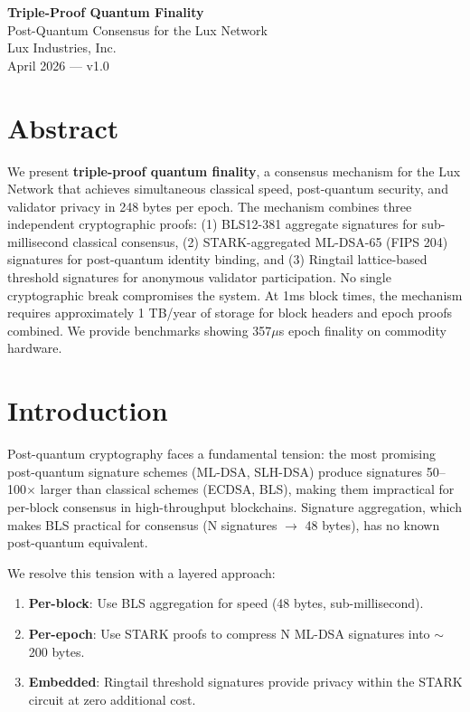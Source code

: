 \documentclass[11pt,a4paper]{article}
\begin{document}
\begin{center}
{\LARGE\bfseries Triple-Proof Quantum Finality}\\[0.5em]
{\Large Post-Quantum Consensus for the Lux Network}\\[1em]
{\large Lux Industries, Inc.}\\[0.5em]
{\normalsize April 2026 --- v1.0}
\end{center}

\vspace{1em}

\section*{Abstract}

We present \textbf{triple-proof quantum finality}, a consensus mechanism for the Lux Network that achieves simultaneous classical speed, post-quantum security, and validator privacy in 248 bytes per epoch. The mechanism combines three independent cryptographic proofs: (1) BLS12-381 aggregate signatures for sub-millisecond classical consensus, (2) STARK-aggregated ML-DSA-65 (FIPS 204) signatures for post-quantum identity binding, and (3) Ringtail lattice-based threshold signatures for anonymous validator participation. No single cryptographic break compromises the system. At 1ms block times, the mechanism requires approximately 1 TB/year of storage for block headers and epoch proofs combined. We provide benchmarks showing 357$\mu$s epoch finality on commodity hardware.

\section{Introduction}

Post-quantum cryptography faces a fundamental tension: the most promising post-quantum signature schemes (ML-DSA, SLH-DSA) produce signatures 50--100$\times$ larger than classical schemes (ECDSA, BLS), making them impractical for per-block consensus in high-throughput blockchains. Signature aggregation, which makes BLS practical for consensus (N signatures $\to$ 48 bytes), has no known post-quantum equivalent.

We resolve this tension with a layered approach:

\begin{enumerate}[leftmargin=2em]
\item \textbf{Per-block}: Use BLS aggregation for speed (48 bytes, sub-millisecond).
\item \textbf{Per-epoch}: Use STARK proofs to compress N ML-DSA signatures into $\sim$200 bytes.
\item \textbf{Embedded}: Ringtail threshold signatures provide privacy within the STARK circuit at zero additional cost.
\end{enumerate}
\end{document}
